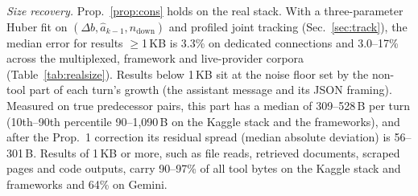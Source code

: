 \begin{table}[t]\centering\caption{Boundary F1 at $\pm$100\,ms (wire clock) on real stacks. Burst-rule CIs are from a connection bootstrap.}\label{tab:realseg}
\end{table}

\emph{Size recovery.} Prop.~\ref{prop:cons} holds on the real stack. With a three-parameter Huber fit on $(\Delta b, \hat a_{k-1}, n_{\mathrm{down}})$ and profiled joint tracking (Sec.~\ref{sec:track}), the median error for results $\geq$1\,KB is 3.3\% on dedicated connections and 3.0--17\% across the multiplexed, framework and live-provider corpora (Table~\ref{tab:realsize}). Results below 1\,KB sit at the noise floor set by the non-tool part of each turn's growth (the assistant message and its JSON framing). Measured on true predecessor pairs, this part has a median of 309--528\,B per turn (10th--90th percentile 90--1,090\,B on the Kaggle stack and the frameworks), and after the Prop.~1 correction its residual spread (median absolute deviation) is 56--301\,B. Results of 1\,KB or more, such as file reads, retrieved documents, scraped pages and code outputs, carry 90--97\% of all tool bytes on the Kaggle stack and frameworks and 64\% on Gemini.

